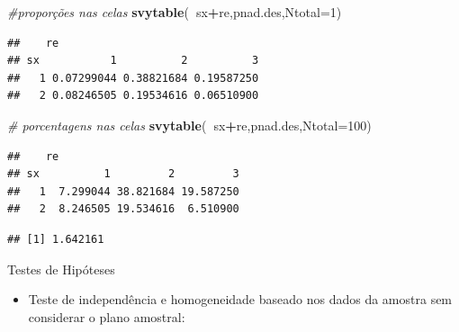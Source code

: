 \documentclass[]{book}
\newenvironment{Shaded}{\begin{snugshade}}{\end{snugshade}}
\newcommand{\KeywordTok}[1]{\textcolor[rgb]{0.13,0.29,0.53}{\textbf{#1}}}
\newcommand{\DataTypeTok}[1]{\textcolor[rgb]{0.13,0.29,0.53}{#1}}
\newcommand{\DecValTok}[1]{\textcolor[rgb]{0.00,0.00,0.81}{#1}}
\newcommand{\StringTok}[1]{\textcolor[rgb]{0.31,0.60,0.02}{#1}}
\newcommand{\CommentTok}[1]{\textcolor[rgb]{0.56,0.35,0.01}{\textit{#1}}}
\newcommand{\OperatorTok}[1]{\textcolor[rgb]{0.81,0.36,0.00}{\textbf{#1}}}
\newcommand{\NormalTok}[1]{#1}
\providecommand{\tightlist}{%
  \setlength{\itemsep}{0pt}\setlength{\parskip}{0pt}}
\theoremstyle{definition}
\theoremstyle{definition}
\theoremstyle{definition}
\theoremstyle{remark}
\let\BeginKnitrBlock\begin \let\EndKnitrBlock\end
\begin{document}
\begin{Shaded}
\begin{Highlighting}[]
\CommentTok{#proporções nas celas}
\KeywordTok{svytable}\NormalTok{(}\OperatorTok{~}\NormalTok{sx}\OperatorTok{+}\NormalTok{re,pnad.des,}\DataTypeTok{Ntotal=}\DecValTok{1}\NormalTok{)}
\end{Highlighting}
\end{Shaded}

\begin{verbatim}
##    re
## sx           1          2          3
##   1 0.07299044 0.38821684 0.19587250
##   2 0.08246505 0.19534616 0.06510900
\end{verbatim}

\begin{Shaded}
\begin{Highlighting}[]
\CommentTok{# porcentagens nas celas}
\KeywordTok{svytable}\NormalTok{(}\OperatorTok{~}\NormalTok{sx}\OperatorTok{+}\NormalTok{re,pnad.des,}\DataTypeTok{Ntotal=}\DecValTok{100}\NormalTok{)}
\end{Highlighting}
\end{Shaded}

\begin{verbatim}
##    re
## sx          1         2         3
##   1  7.299044 38.821684 19.587250
##   2  8.246505 19.534616  6.510900
\end{verbatim}

\begin{Shaded}
\end{Shaded}

\begin{verbatim}
## [1] 1.642161
\end{verbatim}

\BeginKnitrBlock{example}
\protect\hypertarget{exm:exe83}{}{\label{exm:exe83} }Testes de Hipóteses
\EndKnitrBlock{example}

\begin{itemize}
\tightlist
\item
  Teste de independência e homogeneidade baseado nos dados da amostra
  sem considerar o plano amostral:
\end{itemize}
\end{document}
